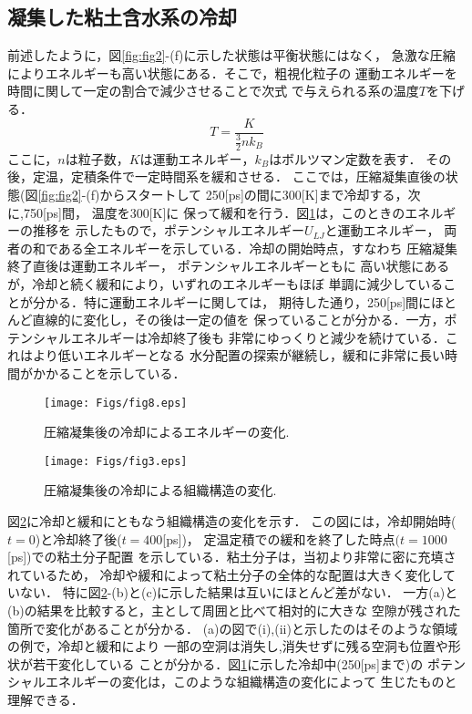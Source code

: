 \subsection{凝集した粘土含水系の冷却}
前述したように，図\ref{fig:fig2}-(f)に示した状態は平衡状態にはなく，
急激な圧縮によりエネルギーも高い状態にある．そこで，粗視化粒子の
運動エネルギーを時間に関して一定の割合で減少させることで次式
で与えられる系の温度$T$を下げる．
\begin{equation}
	T=\frac{K}{\frac{3}{2}nk_B}
	\label{eqn:Temp}
\end{equation}
ここに，$n$は粒子数，$K$は運動エネルギー，$k_B$はボルツマン定数を表す．
その後，定温，定積条件で一定時間系を緩和させる．
ここでは，圧縮凝集直後の状態(図\ref{fig:fig2}-(f)からスタートして
250[ps]の間に300[K]まで冷却する，次に,750[ps]間， 温度を300[K]に
保って緩和を行う．図\ref{fig:fig8}は，このときのエネルギーの推移を
示したもので，ポテンシャルエネルギー$U_{LJ}$と運動エネルギー，
両者の和である全エネルギーを示している．冷却の開始時点，すなわち
圧縮凝集終了直後は運動エネルギー， ポテンシャルエネルギーともに
高い状態にあるが，冷却と続く緩和により，いずれのエネルギーもほぼ
単調に減少していることが分かる．特に運動エネルギーに関しては，
期待した通り，250[ps]間にほとんど直線的に変化し，その後は一定の値を
保っていることが分かる．一方，ポテンシャルエネルギーは冷却終了後も
非常にゆっくりと減少を続けている．これはより低いエネルギーとなる
水分配置の探索が継続し，緩和に非常に長い時間がかかることを示している．
\begin{figure}[h]
	\begin{center}
	\texttt{[image: Figs/fig8.eps]} 
	\end{center}
	\caption{
		圧縮凝集後の冷却によるエネルギーの変化.
	} 
	\label{fig:fig8}
\end{figure}
\begin{figure}[h]
	\begin{center}
	\texttt{[image: Figs/fig3.eps]} 
	\end{center}
	\caption{
		圧縮凝集後の冷却による組織構造の変化.
	} 
	\label{fig:fig3}
\end{figure}

図\ref{fig:fig3}に冷却と緩和にともなう組織構造の変化を示す．
この図には，冷却開始時($t=0$)と冷却終了後($t=400$[ps])，
定温定積での緩和を終了した時点$(t=1000$[ps])での粘土分子配置
を示している．粘土分子は，当初より非常に密に充填されているため，
冷却や緩和によって粘土分子の全体的な配置は大きく変化していない．
特に図\ref{fig:fig3}-(b)と(c)に示した結果は互いにほとんど差がない．
一方(a)と(b)の結果を比較すると，主として周囲と比べて相対的に大きな
空隙が残された箇所で変化があることが分かる．
(a)の図で(i),(ii)と示したのはそのような領域の例で，冷却と緩和により
一部の空洞は消失し,消失せずに残る空洞も位置や形状が若干変化している
ことが分かる．図\ref{fig:fig8}に示した冷却中(250[ps]まで)の
ポテンシャルエネルギーの変化は，このような組織構造の変化によって
生じたものと理解できる．
